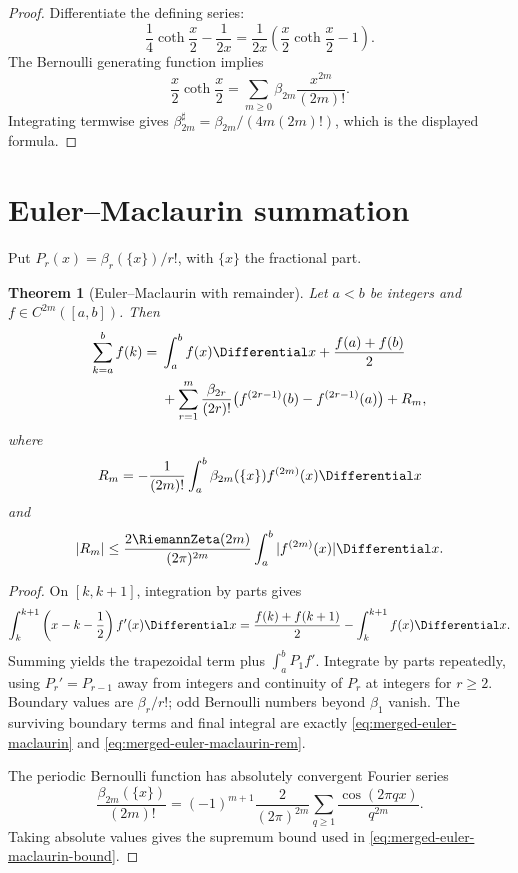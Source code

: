 \documentclass[11pt,a4paper,oneside,openany]{book}
\newtheorem{theorem}{Theorem}[chapter]
\theoremstyle{definition}
\theoremstyle{remark}
\begin{document}
\begin{proof}
Differentiate the defining series:
\[
 \frac14\coth\frac x2-\frac1{2x}
 =\frac1{2x}\left(\frac x2\coth\frac x2-1\right).
\]
The Bernoulli generating function implies
\[
 \frac x2\coth\frac x2=\sum_{m\geq0}\beta_{2m}\frac{x^{2m}}{(2m)!}.
\]
Integrating termwise gives
$\beta_{2m}^{\sharp}=\beta_{2m}/(4m(2m)!)$, which is the displayed formula.
\end{proof}

\section{Euler--Maclaurin summation}

Put $P_r(x)=\beta_r(\{x\})/r!$, with $\{x\}$ the fractional part.

\begin{theorem}[Euler--Maclaurin with remainder]
\label{thm:merged-euler-maclaurin}
Let $a<b$ be integers and $f\in C^{2m}([a,b])$.  Then
\begin{align}
 \sum_{k=a}^{b}f(k)
 ={}&\int_a^b f(x)\Differential x+\frac{f(a)+f(b)}2                           \notag\\
 &+\sum_{r=1}^{m}\frac{\beta_{2r}}{(2r)!}
 \bigl(f^{(2r-1)}(b)-f^{(2r-1)}(a)\bigr)+R_m,                      \label{eq:merged-euler-maclaurin}
\end{align}
where
\begin{equation}
 R_m=-\frac1{(2m)!}\int_a^b\beta_{2m}(\{x\})f^{(2m)}(x)\Differential x       \label{eq:merged-euler-maclaurin-rem}
\end{equation}
and
\begin{equation}
 |R_m|\leq\frac{2\RiemannZeta(2m)}{(2\pi)^{2m}}
                  \int_a^b|f^{(2m)}(x)|\Differential x.                     \label{eq:merged-euler-maclaurin-bound}
\end{equation}
\end{theorem}

\begin{proof}
On $[k,k+1]$, integration by parts gives
\[
 \int_k^{k+1}\left(x-k-\frac12\right)f'(x)\Differential x
 =\frac{f(k)+f(k+1)}2-\int_k^{k+1}f(x)\Differential x.
\]
Summing yields the trapezoidal term plus $\int_a^bP_1f'$.  Integrate by parts
repeatedly, using $P_r'=P_{r-1}$ away from integers and continuity of $P_r$ at
integers for $r\geq2$.  Boundary values are $\beta_r/r!$; odd Bernoulli
numbers beyond $\beta_1$ vanish.  The surviving boundary terms and final
integral are exactly \eqref{eq:merged-euler-maclaurin} and
\eqref{eq:merged-euler-maclaurin-rem}.

The periodic Bernoulli function has absolutely convergent Fourier series
\[
 \frac{\beta_{2m}(\{x\})}{(2m)!}
 =(-1)^{m+1}\frac{2}{(2\pi)^{2m}}
   \sum_{q\geq1}\frac{\cos(2\pi qx)}{q^{2m}}.
\]
Taking absolute values gives the supremum bound used in
\eqref{eq:merged-euler-maclaurin-bound}.
\end{proof}
\end{document}
